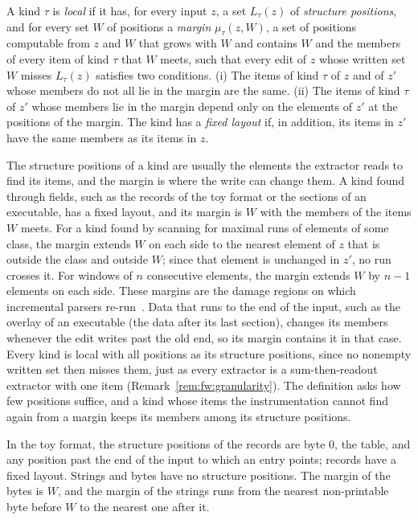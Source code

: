 \label{def:fw:local}
{
A kind $\tau$ is \emph{local} if it has, for every input $z$, a set $L_\tau(z)$ of \emph{structure positions}, and for
every set $W$ of positions a \emph{margin} $\mu_\tau(z, W)$, a set of positions computable from $z$ and $W$ that grows
with $W$ and contains $W$ and the members of every item of kind $\tau$ that $W$ meets, such that every edit of $z$
whose written set $W$ misses $L_\tau(z)$ satisfies two conditions. (i) The items of kind $\tau$ of $z$ and of $z'$
whose members do not all lie in the margin are the same. (ii) The items of kind $\tau$ of $z'$ whose members lie in the
margin depend only on the elements of $z'$ at the positions of the margin. The kind has a \emph{fixed layout} if, in
addition, its items in $z'$ have the same members as its items in $z$.
}

\noindent The structure positions of a kind are usually the elements the extractor reads to find its items, and the
margin is where the write can change them. A kind found through fields, such as the records of the toy format or the
sections of an executable, has a fixed layout, and its margin is $W$ with the members of the items $W$ meets. For a
kind found by scanning for maximal runs of elements of some class, the margin extends $W$ on each side to the nearest
element of $z$ that is outside the class and outside $W$; since that element is unchanged in $z'$, no run crosses it.
For windows of $n$ consecutive elements, the margin extends $W$ by $n - 1$ elements on each side. These margins are the
damage regions on which incremental parsers re-run~\cite{wagner1998efficient}. Data that runs to the end of the input,
such as the overlay of an executable (the data after its last section), changes its members whenever the edit writes past the old end, so its margin
contains it in that case. Every kind is local with all positions as its structure positions, since no nonempty written
set then misses them, just as every extractor is a sum-then-readout extractor with one item
(Remark~\ref{rem:fw:granularity}). The definition asks how few positions suffice, and a kind whose items the
instrumentation cannot find again from a margin keeps its members among its structure positions.
\begin{runex}
In the toy format, the structure positions of the records are byte 0, the table, and any position past the end of the
input to which an entry points; records have a fixed layout. Strings and bytes have no structure positions. The margin
of the bytes is $W$, and the margin of the strings runs from the nearest non-printable byte before $W$ to the nearest
one after it.
\end{runex}

